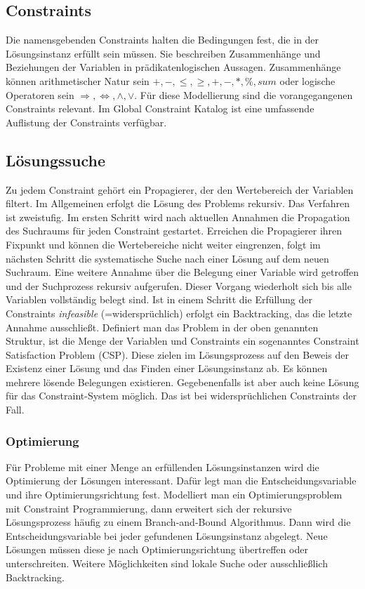 \subsection{Constraints}
Die namensgebenden Constraints halten die Bedingungen fest, die in der Lösungsinstanz erfüllt sein müssen. Sie beschreiben Zusammenhänge und Beziehungen der Variablen in prädikatenlogischen Aussagen.\newline
Zusammenhänge können arithmetischer Natur sein $ +, -, \le, \ge, +, -, * , \%, sum$ oder logische Operatoren sein $\Rightarrow, \Leftrightarrow, \wedge, \vee $.
Für diese Modellierung sind die vorangegangenen Constraints relevant. Im Global Constraint Katalog \cite{GlobalConstraintWeb} ist eine umfassende Auflistung der Constraints verfügbar. 
\subsection{Lösungssuche}
Zu jedem Constraint gehört ein Propagierer, der den Wertebereich der Variablen filtert. Im Allgemeinen erfolgt die Lösung des Problems rekursiv. Das Verfahren ist zweistufig. Im ersten Schritt wird nach aktuellen Annahmen die Propagation des Suchraums für jeden Constraint gestartet. Erreichen die Propagierer ihren Fixpunkt und können die Wertebereiche nicht weiter eingrenzen, folgt im nächsten Schritt die systematische Suche nach einer Lösung auf dem neuen Suchraum. Eine weitere Annahme über die Belegung einer Variable wird getroffen und der Suchprozess rekursiv aufgerufen. Dieser Vorgang wiederholt sich bis alle Variablen vollständig belegt sind. Ist in einem Schritt die Erfüllung der Constraints \textit{infeasible} (=widersprüchlich) erfolgt ein Backtracking, das die letzte Annahme ausschließt.
Definiert man das Problem in der oben genannten Struktur, ist die Menge der Variablen und Constraints ein sogenanntes Constraint Satisfaction Problem (CSP). Diese zielen im Lösungsprozess auf den Beweis der Existenz einer Lösung und das Finden einer Lösungsinstanz ab. Es können mehrere lösende Belegungen existieren. Gegebenenfalls ist aber auch keine Lösung für das Constraint-System möglich. Das ist bei widersprüchlichen Constraints der Fall. 

\subsubsection{Optimierung}
Für Probleme mit einer Menge an erfüllenden Lösungsinstanzen wird die Optimierung der Lösungen interessant. Dafür legt man die Entscheidungsvariable und ihre Optimierungsrichtung fest. 
Modelliert man ein Optimierungsproblem mit Constraint Programmierung, dann erweitert sich der rekursive Lösungsprozess häufig zu einem Branch-and-Bound Algorithmus. Dann wird die Entscheidungsvariable bei jeder gefundenen Lösungsinstanz abgelegt. Neue Lösungen müssen diese je nach Optimierungsrichtung übertreffen oder unterschreiten.
Weitere Möglichkeiten sind lokale Suche oder ausschließlich Backtracking.


